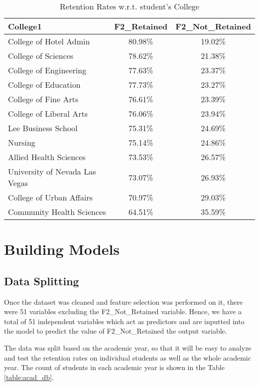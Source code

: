 \documentclass[11pt,openright]{report}
\begin{document}
\begin{table}[!t]
	\renewcommand{\arraystretch}{1.3}
	\caption{Retention Rates w.r.t. student's College}
	\label{table:college_retentions}
	\centering
	\begin{tabular}{|l|c|c|}
		\hline
		\bfseries College1 & \bfseries F2\_Retained & \bfseries F2\_Not\_Retained\\
		\hline
		College of Hotel Admin  & 80.98\%  & 19.02\% \\ \hline
		College of Sciences & 78.62\% &  21.38\% \\ \hline
		College of Engineering & 77.63\% & 23.37\% \\ \hline
		College of Education    &   77.73\% &  23.27\% \\ \hline
		College of Fine Arts &  76.61\%  & 23.39\% \\ \hline
		College of Liberal Arts & 76.06\% & 23.94\% \\ \hline
		Lee Business School  & 75.31\% &  24.69\% \\ \hline
		Nursing    &  75.14\%  & 24.86\% \\ \hline
		Allied Health Sciences  & 73.53\% &  26.57\% \\ \hline
		University of Nevada Las Vegas     & 73.07\% &  26.93\% \\ \hline
		College of Urban Affairs  &         70.97\% &  29.03\% \\ \hline
		Community Health Sciences         &    64.51\% & 35.59\% \\ \hline
	\end{tabular}
\end{table}


\chapter{Building Models} \label{chapter:building_models}

\section {Data Splitting }

Once the dataset was cleaned and feature selection was performed on it, there were 51 variables excluding the F2\_Not\_Retained variable. Hence, we have a total of 51 independent variables which act as predictors and are inputted into the model to predict the value of F2\_Not\_Retained the output variable. 

The data was split based on the academic year, so that it will be easy to analyze and test the retention rates on individual students as well as the whole academic year. The count of students in each academic year is shown in the Table \ref{table:acad_db}.
\end{document}
